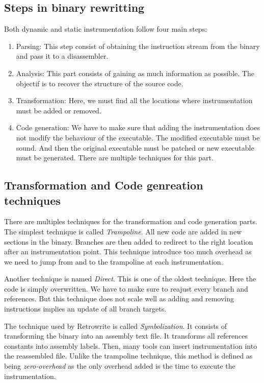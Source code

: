 \documentclass[a4paper,11pt,oneside]{report}
\newcommand{\sysname}{Retrowrite\xspace}
\begin{document}
\subsection{Steps in binary rewritting}
Both dynamic and static instrumentation follow four main steps:
\begin{enumerate}
    \item Parsing:
        This step consist of obtaining the instruction stream from the binary
        and pass it to a disassembler.
    \item Analysis:
        This part consists of gaining as much information as possible. The
        objectif is to recover the structure of the source code.
    \item Transformation:
        Here, we must find all the locations where instrumentation must be
        added or removed. 
    \item Code generation:
        We have to make sure that adding the instrumentation does not modify the
        behaviour of the executable. The modified executable must be sound. And
        then the original executable must be patched or new executable must be
        generated.
        There are multiple techniques for this part. 
\end{enumerate}



\subsection{Transformation and Code genreation techniques}
There are multiples techniques for the transformation and code generation
parts. The simplest technique is called \textit{Trampoline}. All new code are
added in new sections in the binary. Branches are then added to redirect to the
right location after an instrumentation point. This technique introduce too much overhead as we
need to jump from and to the trampoline at each instrumentation. 


Another technique is named \textit{Direct}. This is one of the oldest
technique. Here the code is simply overwritten. We have to make sure to reajust
every branch and references.  But this technique does not scale well as adding
and removing instructions implies an update of all branch targets.


The technique used by \sysname is called \textit{Symbolization}. It
consists of transforming the binary into an assembly text file. It transforms
all references constants into assembly labels. Then, many tools can insert
instrumentation into the reassembled file. Unlike the trampoline technique,
this method is defined as being \textit{zero-overhead} as the only overhead
added is the time to execute the instrumentation.
\end{document}
